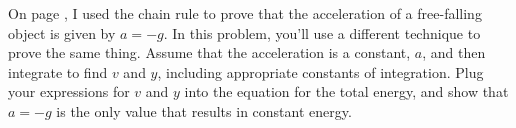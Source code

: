 On page \pageref{gaccelproof}, I used the chain rule to prove that the acceleration
        of a free-falling object is given by $a=-g$. In this problem, you'll use a different
        technique to prove the same thing. Assume that the acceleration is a constant,
        $a$, and then integrate to find $v$ and $y$, including appropriate constants of
        integration. Plug your expressions for $v$ and $y$ into the equation for
        the total energy, and show that $a=-g$ is the only value that results in constant
        energy.
